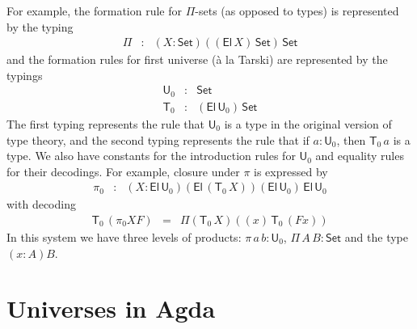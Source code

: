 \documentclass[11pt,a4paper]{article}
\def\UU{\mathsf{U}}
\newcommand{\Set}{\mathsf{Set}}
\newcommand{\El}{\mathsf{El}}
\newcommand{\T}{\mathsf{T}}
\begin{document}
For example, the formation rule for $\Pi$-sets (as opposed to types) is represented by the typing
\begin{eqnarray*}
\Pi &:& (X:\Set)((\El\,X)\,\Set)\,\Set
\end{eqnarray*}
and the formation rules for first universe (\`a la Tarski) are represented by the typings
\begin{eqnarray*}
\UU_0 &: &\Set\\
\T_0 &:& (\El\,\UU_0)\,\Set
\end{eqnarray*}
The first typing represents the rule that $\UU_0$ is a type in the original version of type theory, and the second typing represents the rule that if $a : \UU_0$, then $\T_0\,a$ is a type. We also have constants for the introduction rules for $\UU_0$ and equality rules for their decodings. For example, closure under $\pi$ is expressed by
\begin{eqnarray*}
\pi_0 &:& (X:\El\, \UU_0)(\El\, (\T_0\, X))(\El\, \UU_0)\,\El\, \UU_0
\end{eqnarray*}
with decoding
\begin{eqnarray*}
\T_0\, (\pi_0 X F) &=& \Pi (\T_0\, X) ((x)\,\T_0\, (F x))
\end{eqnarray*}
In this system we have three levels of products: $\pi\,a\,b : \UU_0$, $\Pi\,A\,B : \Set$ and the type $(x : A)B$.
%
%
%

\section{Universes in Agda}
\end{document}
